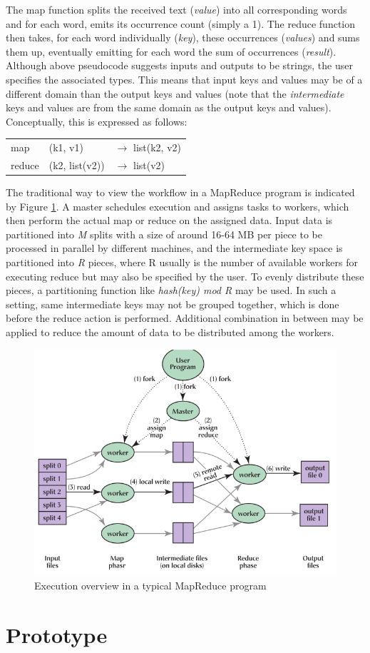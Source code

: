 The map function splits the received text (\textit{value}) into all corresponding words and for each word, emits its occurrence count (simply a 1). The reduce function then takes, for each word individually (\textit{key}), these occurrences (\textit{values}) and sums them up, eventually emitting for each word the sum of occurrences (\textit{result}). Although above pseudocode suggests inputs and outputs to be strings, the user specifies the associated types. This means that input keys and values may be of a different domain than the output keys and values (note that the \textit{intermediate} keys and values are from the same domain as the output keys and values). Conceptually, this is expressed as follows:
\newline
\newline
\begin{tabular}{lll}
map	& (k1, v1) & $\to$ list(k2, v2)\\
reduce & (k2, list(v2)) & $\to$ list(v2)
\end{tabular}

The traditional way to view the workflow in a MapReduce program is indicated by Figure \ref{fig:mapreduce_workflow}. A master schedules execution and assigns tasks to workers, which then perform the actual map or reduce on the assigned data. Input data is partitioned into \textit{M} splits with a size of around 16-64 MB per piece to be processed in parallel by different machines, and the intermediate key space is partitioned into \textit{R} pieces, where R usually is the number of available workers for executing reduce but may also be specified by the user. To evenly distribute these pieces, a partitioning function like \textit{hash(key) mod R} may be used. In such a setting, same intermediate keys may not be grouped together, which is done before the reduce action is performed. Additional combination in between may be applied to reduce the amount of data to be distributed among the workers.

\begin{figure}
	\centering	
	\includegraphics{mapreduce_workflow}
	\caption{Execution overview in a typical MapReduce program}	
	\label{fig:mapreduce_workflow}
\end{figure} 
\section{Prototype}
